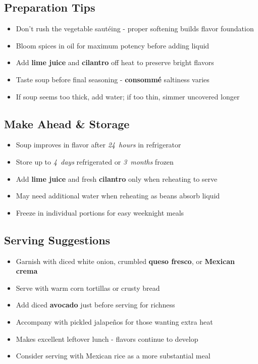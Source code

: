 \documentclass[11pt,letterpaper]{article}
\begin{document}
{\begin{multicols}{2}
\subsection*{Preparation Tips}
\begin{itemize}
    \item Don't rush the vegetable sautéing - proper softening builds flavor foundation
    \item Bloom spices in oil for maximum potency before adding liquid
    \item Add \textbf{lime juice} and \textbf{cilantro} off heat to preserve bright flavors
    \item Taste soup before final seasoning - \textbf{consommé} saltiness varies
    \item If soup seems too thick, add water; if too thin, simmer uncovered longer
\end{itemize}

\subsection*{Make Ahead \& Storage}
\begin{itemize}
    \item Soup improves in flavor after \textit{24~hours} in refrigerator
    \item Store up to \textit{4~days} refrigerated or \textit{3~months} frozen
    \item Add \textbf{lime juice} and fresh \textbf{cilantro} only when reheating to serve
    \item May need additional water when reheating as beans absorb liquid
    \item Freeze in individual portions for easy weeknight meals
\end{itemize}

\subsection*{Serving Suggestions}
\begin{itemize}
    \item Garnish with diced white onion, crumbled \textbf{queso fresco}, or \textbf{Mexican crema}
    \item Serve with warm corn tortillas or crusty bread
    \item Add diced \textbf{avocado} just before serving for richness
    \item Accompany with pickled jalapeños for those wanting extra heat
    \item Makes excellent leftover lunch - flavors continue to develop
    \item Consider serving with Mexican rice as a more substantial meal
\end{itemize}

\end{multicols}
}
\end{document}
